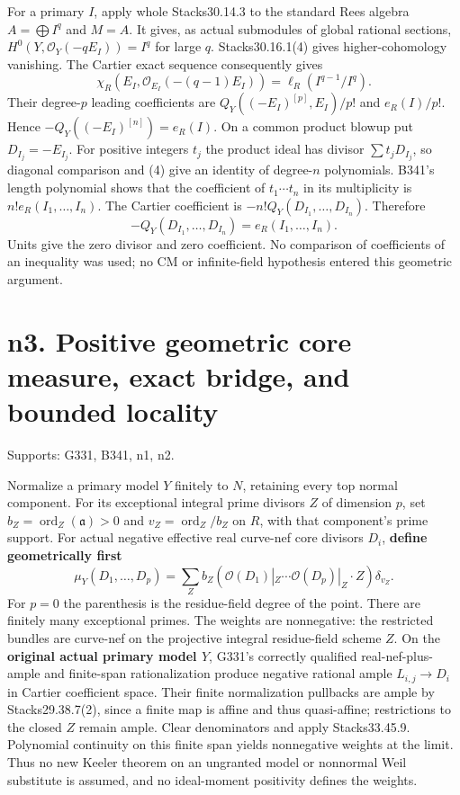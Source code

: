 \documentclass[
  11pt,
]{article}
\begin{document}
For a primary \(I\), apply whole Stacks30.14.3 to the standard Rees
algebra \(A=\bigoplus I^q\) and \(M=A\). It gives, as actual submodules
of global rational sections, \(H^0(Y,\mathcal O_Y(-qE_I))=I^q\) for
large \(q\). Stacks30.16.1(4) gives higher-cohomology vanishing. The
Cartier exact sequence consequently gives
\[\chi_R(E_I,\mathcal O_{E_I}(-(q-1)E_I))=\ell_R(I^{q-1}/I^q).\] Their
degree-\(p\) leading coefficients are \(Q_Y((-E_I)^{[p]},E_I)/p!\) and
\(e_R(I)/p!\). Hence \(-Q_Y((-E_I)^{[n]})=e_R(I)\). On a common product
blowup put \(D_{I_j}=-E_{I_j}\). For positive integers \(t_j\) the
product ideal has divisor \(\sum t_jD_{I_j}\), so diagonal comparison
and (4) give an identity of degree-\(n\) polynomials. B341's length
polynomial shows that the coefficient of \(t_1\cdots t_n\) in its
multiplicity is \(n!e_R(I_1,\ldots,I_n)\). The Cartier coefficient is
\(-n!Q_Y(D_{I_1},\ldots,D_{I_n})\). Therefore
\[-Q_Y(D_{I_1},\ldots,D_{I_n})=e_R(I_1,\ldots,I_n).\tag{5}\] Units give
the zero divisor and zero coefficient. No comparison of coefficients of
an inequality was used; no CM or infinite-field hypothesis entered this
geometric argument.

\section{n3. Positive geometric core measure, exact bridge, and bounded
locality}\label{n3.-positive-geometric-core-measure-exact-bridge-and-bounded-locality}

Supports: G331, B341, n1, n2.

Normalize a primary model \(Y\) finitely to \(N\), retaining every top
normal component. For its exceptional integral prime divisors \(Z\) of
dimension \(p\), set \(b_Z=\operatorname{ord}_Z(\mathfrak a)>0\) and
\(v_Z=\operatorname{ord}_Z/b_Z\) on \(R\), with that component's prime
support. For actual negative effective real curve-nef core divisors
\(D_i\), \textbf{define geometrically first}
\[\mu_Y(D_1,\ldots,D_p)=\sum_Z b_Z(\mathcal O(D_1)|_Z\cdots\mathcal O(D_p)|_Z\cdot Z)\delta_{v_Z}.\tag{6}\]
For \(p=0\) the parenthesis is the residue-field degree of the point.
There are finitely many exceptional primes. The weights are nonnegative:
the restricted bundles are curve-nef on the projective integral
residue-field scheme \(Z\). On the \textbf{original actual primary model
\(Y\)}, G331's correctly qualified real-nef-plus-ample and finite-span
rationalization produce negative rational ample \(L_{i,j}\to D_i\) in
Cartier coefficient space. Their finite normalization pullbacks are
ample by Stacks29.38.7(2), since a finite map is affine and thus
quasi-affine; restrictions to the closed \(Z\) remain ample. Clear
denominators and apply Stacks33.45.9. Polynomial continuity on this
finite span yields nonnegative weights at the limit. Thus no new Keeler
theorem on an ungranted model or nonnormal Weil substitute is assumed,
and no ideal-moment positivity defines the weights.
\end{document}
